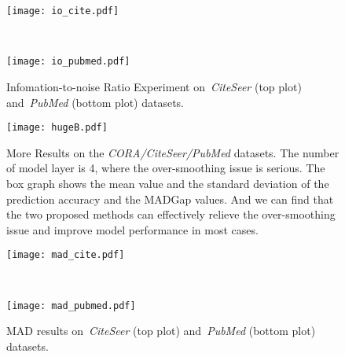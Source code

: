 \documentclass[letterpaper]{article} \usepackage{aaai20}  \usepackage{times}  \usepackage{helvet} \usepackage{courier}  \usepackage[hyphens]{url}  \usepackage{graphicx} \urlstyle{rm} \def\UrlFont{\rm}  \frenchspacing  \setlength{\pdfpagewidth}{8.5in}  \setlength{\pdfpageheight}{11in}  \setcounter{secnumdepth}{0}
\begin{document}
\begin{figure*}[t]
\centering
\small
\begin{minipage}{1.0\textwidth}
  \centering
  \texttt{[image: io\_cite.pdf]}
\end{minipage}\\
\begin{minipage}{1.0\textwidth}
  \centering
  \texttt{[image: io\_pubmed.pdf]}
\end{minipage}\caption{Infomation-to-noise Ratio Experiment on~\textit{CiteSeer} (top plot) and~\textit{PubMed} (bottom plot) datasets.}
\label{figure_mergeB}
\end{figure*}

\begin{figure*}[!t]
\centering
\texttt{[image: hugeB.pdf]}
\caption{More Results on the \textit{CORA/CiteSeer/PubMed} datasets. The number of model layer is 4, where the over-smoothing issue is serious. The box graph shows the mean value and the standard deviation of the prediction accuracy and the MADGap values. And we can find that the two proposed methods can effectively relieve the over-smoothing issue and improve model performance in most cases.}
\label{figure_box2}
\end{figure*}

\begin{figure}[t]
\centering
\small
\begin{minipage}{.48\textwidth}
  \centering
  \texttt{[image: mad\_cite.pdf]}
\end{minipage}\\
\begin{minipage}{.48\textwidth}
  \centering
  \texttt{[image: mad\_pubmed.pdf]}
\end{minipage}\caption{MAD results on~\textit{CiteSeer} (top plot) and~\textit{PubMed} (bottom plot) datasets.}
\label{figure_mergeA}
\end{figure}
\end{document}

